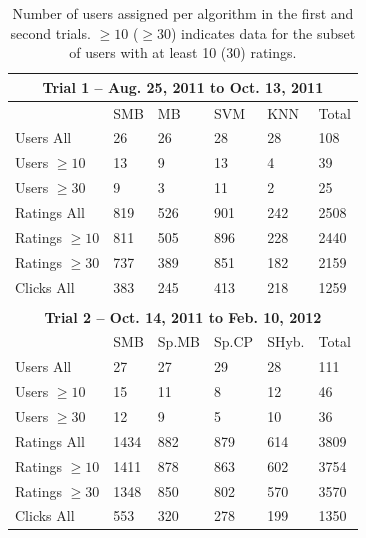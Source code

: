 \begin{table}[t!]
\centering \footnotesize
\begin{tabular}{|l|l|l|l|l|l|}
\multicolumn{6}{c}{\bf Trial 1 -- Aug. 25, 2011 to Oct. 13, 2011 } \\ \hline
 & {\rm SMB} & {\rm MB} & {\rm SVM} & {\rm KNN} & {\rm Total}\\ \hline
{\rm Users All} & 26 & 26 & 28 & 28 & 108 \\
{\rm Users $\geq 10$} & 13 & 9 & 13 & 4 & 39 \\
{\rm Users $\geq 30$} &  9 & 3 & 11 & 2 & 25 \\ \hline
{\rm Ratings All}  & 819 & 526 & 901 & 242 & 2508 \\
{\rm Ratings $\geq 10$} & 811 & 505 & 896 & 228 & 2440 \\
{\rm Ratings $\geq 30$} & 737 & 389 & 851 & 182 & 2159 \\ \hline %
{\rm Clicks All}   & 383 & 245 & 413 & 218 & 1259 \\ \hline
\multicolumn{6}{c}{} \\ 
\multicolumn{6}{c}{\bf Trial 2 -- Oct. 14, 2011 to Feb. 10, 2012} \\ \hline
 & {\rm SMB} & {\rm Sp.MB} & {\rm Sp.CP} & {\rm SHyb.} & {\rm Total}\\ \hline
{\rm Users All} & 27 & 27 & 29 & 28 & 111 \\
{\rm Users $\geq 10$} & 15 & 11 & 8 & 12 & 46 \\
{\rm Users $\geq 30$} & 12 & 9  & 5 & 10 & 36 \\ \hline
{\rm Ratings All}  & 1434 & 882 & 879 & 614 & 3809 \\ 
{\rm Ratings $\geq 10$} & 1411 & 878 & 863 & 602 & 3754 \\
{\rm Ratings $\geq 30$} & 1348 & 850 & 802 & 570 & 3570 \\ \hline %
{\rm Clicks All}   & 553  & 320 & 278 & 199 & 1350 \\ \hline
\end{tabular}
\caption{\footnotesize
Number of users assigned per algorithm in the first and
second trials.  $\geq 10$ ($\geq 30$) indicates data for
the subset of users with at least 10 (30) ratings.}
\label{tab:Assigned1}
\end{table}

